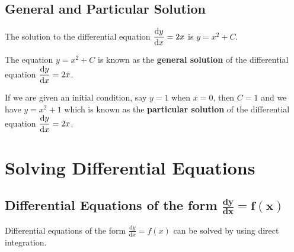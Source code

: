\documentclass[11pt,a4paper]{book}
\begin{document}
\subsection{General and Particular Solution}

The solution to the differential equation ${\displaystyle \frac{{\rm d}y}{{\rm d}x}=2x}$
is $y=x^{2}+C$.

The equation $y=x^{2}+C$ is known as the \textbf{general solution}
of the differential equation ${\displaystyle \frac{{\rm d}y}{{\rm d}x}=2x}$.

If we are given an initial condition, say $y=1$ when $x=0$, then
$C=1$ and we have $y=x^{2}+1$ which is known as the \textbf{particular
solution} of the differential equation ${\displaystyle \frac{{\rm d}y}{{\rm d}x}=2x}$.

\newpage

\section{Solving Differential Equations}

\subsection{Differential Equations of the form $\boldsymbol{\frac{\textbf{d}y}{\textbf{d}x}=f\left(x\right)}$}

Differential equations of the form ${\displaystyle \frac{\mathrm{d}y}{\mathrm{d}x}=f\left(x\right)}$
can be solved by using direct integration.
\end{document}
